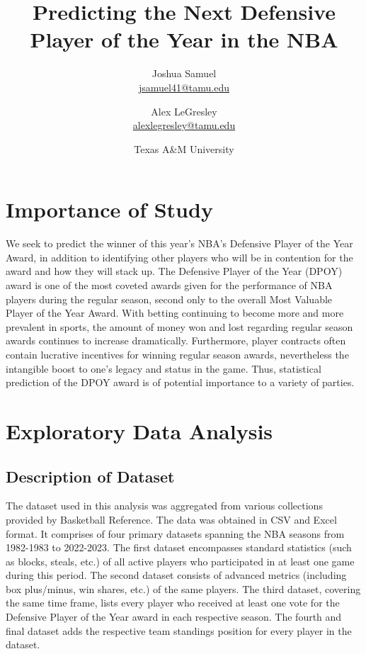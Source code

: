 \documentclass[letterpaper,titlepage]{article}
\title{Predicting the Next Defensive Player of the Year in the NBA}
\author{
    Joshua Samuel \\ \href{mailto:jsamuel41@tamu.edu}{jsamuel41@tamu.edu}
    \and
    Alex LeGresley \\ \href{mailto:alexlegresley@tamu.edu}{alexlegresley@tamu.edu}
}
\date{Texas A\&M University}
\begin{document}
    \maketitle
    \tableofcontents
    \clearpage


    \section{Importance of Study}
    We seek to predict the winner of this year's NBA's Defensive Player of the Year Award, in addition to identifying other players who will be in contention for the award and how they will stack up. The Defensive Player of the Year (DPOY) award is one of the most coveted awards given for the performance of NBA players during the regular season, second only to the overall Most Valuable Player of the Year Award. With betting continuing to become more and more prevalent in sports, the amount of money won and lost regarding regular season awards continues to increase dramatically. Furthermore, player contracts often contain lucrative incentives for winning regular season awards, nevertheless the intangible boost to one's legacy and status in the game. Thus, statistical prediction of the DPOY award is of potential importance to a variety of parties.

    
    \section{Exploratory Data Analysis}

    \subsection{Description of Dataset}
    The dataset used in this analysis was aggregated from various collections provided by Basketball Reference. The data was obtained in CSV and Excel format. It comprises of four primary datasets spanning the NBA seasons from 1982-1983 to 2022-2023. The first dataset encompasses standard statistics (such as blocks, steals, etc.) of all active players who participated in at least one game during this period. The second dataset consists of advanced metrics (including box plus/minus, win shares, etc.) of the same players. The third dataset, covering the same time frame, lists every player who received at least one vote for the Defensive Player of the Year award in each respective season. The fourth and final dataset adds the respective team standings position for every player in the dataset.
\end{document}

